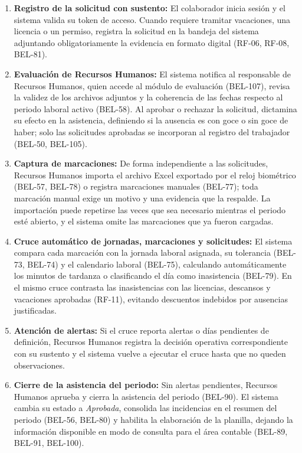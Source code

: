 \begin{enumerate}
    \item \textbf{Registro de la solicitud con sustento:} El colaborador inicia sesión y el sistema valida su token de acceso. Cuando requiere tramitar vacaciones, una licencia o un permiso, registra la solicitud en la bandeja del sistema adjuntando obligatoriamente la evidencia en formato digital (RF-06, RF-08, BEL-81).
    \item \textbf{Evaluación de Recursos Humanos:} El sistema notifica al responsable de Recursos Humanos, quien accede al módulo de evaluación (BEL-107), revisa la validez de los archivos adjuntos y la coherencia de las fechas respecto al periodo laboral activo (BEL-58). Al aprobar o rechazar la solicitud, dictamina su efecto en la asistencia, definiendo si la ausencia es con goce o sin goce de haber; solo las solicitudes aprobadas se incorporan al registro del trabajador (BEL-50, BEL-105).
    \item \textbf{Captura de marcaciones:} De forma independiente a las solicitudes, Recursos Humanos importa el archivo Excel exportado por el reloj biométrico (BEL-57, BEL-78) o registra marcaciones manuales (BEL-77); toda marcación manual exige un motivo y una evidencia que la respalde. La importación puede repetirse las veces que sea necesario mientras el periodo esté abierto, y el sistema omite las marcaciones que ya fueron cargadas.
    \item \textbf{Cruce automático de jornadas, marcaciones y solicitudes:} El sistema compara cada marcación con la jornada laboral asignada, su tolerancia (BEL-73, BEL-74) y el calendario laboral (BEL-75), calculando automáticamente los minutos de tardanza o clasificando el día como inasistencia (BEL-79). En el mismo cruce contrasta las inasistencias con las licencias, descansos y vacaciones aprobadas (RF-11), evitando descuentos indebidos por ausencias justificadas.
    \item \textbf{Atención de alertas:} Si el cruce reporta alertas o días pendientes de definición, Recursos Humanos registra la decisión operativa correspondiente con su sustento y el sistema vuelve a ejecutar el cruce hasta que no queden observaciones.
    \item \textbf{Cierre de la asistencia del periodo:} Sin alertas pendientes, Recursos Humanos aprueba y cierra la asistencia del periodo (BEL-90). El sistema cambia su estado a \textit{Aprobada}, consolida las incidencias en el resumen del periodo (BEL-56, BEL-80) y habilita la elaboración de la planilla, dejando la información disponible en modo de consulta para el área contable (BEL-89, BEL-91, BEL-100).
\end{enumerate}

